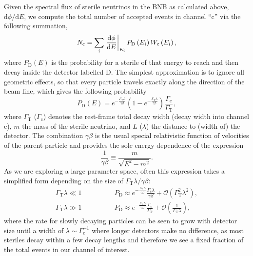 \documentclass[11pt, a4paper]{article}
\def\ster{\ensuremath N}
\begin{document}
\begin{figure}[t]
\center

\end{figure}

Given the spectral flux of sterile neutrinos in the BNB as calculated above,
$\mathrm{d}\phi/\mathrm{d}E$, we compute the total number of accepted events in
channel ``$\text{c}$'' via the following summation,
%
\[ \ster_\text{c} = \sum_{i} \left .
\frac{\mathrm{d}\phi}{\mathrm{d}E}\right|_{E_i} P_\text{D}\left(E_i\right)
W_\text{c}\left(E_i\right),  \]
%
where $P_\text{D}(E)$ is the probability for a sterile of that energy to reach
and then decay inside the detector labelled $\text{D}$. The simplest
approximation is to ignore all geometric effects, so that every particle
travels exactly along the direction of the beam line, which gives the following
probability 
%
\[ P_\text{D}\left(E\right) = e^{-\frac{\Gamma_\text{T}L}{\gamma\beta}}\left(
1-
e^{-\frac{\Gamma_\text{T}\lambda}{\gamma\beta}}\right)\frac{\Gamma_\text{c}}{\Gamma_\text{T}},
\label{eq:prob} \]
%
where $\Gamma_\text{T}$ ($\Gamma_\text{c}$) denotes the rest-frame total decay
width (decay width into channel $\text{c}$), $m$ the mass of the sterile
neutrino, and $L$ ($\lambda$) the distance to (width of) the detector. The
combination $\gamma\beta$ is the usual special relativistic function of
velocities of the parent particle and provides the sole energy dependence of
the expression
%
\[   \frac{1}{\gamma\beta} \equiv \frac{m}{\sqrt{E^2-m^2}}. \]
%
As we are exploring a large parameter space, often this expression takes a
simplified form depending on the size of $\Gamma_\text{T}\lambda/\gamma\beta$:
%
\begin{align} 
%
\Gamma_\text{T}\lambda \ll 1\qquad&\qquad P_\text{D} \approx
e^{-\frac{\Gamma_\text{T}L}{\gamma\beta}}\frac{\Gamma_\text{c}\lambda}{\gamma\beta}
+ \mathcal{O}\left(\Gamma_\text{T}^2\lambda^2\right),\label{eq:prob_dec1}\\
%
\Gamma_\text{T}\lambda \gg 1\qquad&\qquad P_\text{D} \approx
e^{-\frac{\Gamma_\text{T}L}{\gamma\beta}}\frac{\Gamma_\text{c}}{\Gamma_\text{T}}
+ \mathcal{O}\left(\frac{1}{\Gamma_\text{T}\lambda}\right), \label{eq:prob_dec2}
%
\end{align}
%
where the rate for slowly decaying particles can be seen to grow with detector
size until a width of $\lambda\sim\Gamma_\text{c}^{-1}$ where longer detectors
make no difference, as most steriles decay within a few decay lengths and
therefore we see a fixed fraction of the total events in our channel of
interest. 
\end{document}
